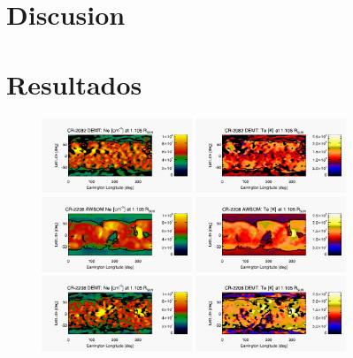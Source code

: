 \documentclass[baaa]{baaa}
\begin{document}
\section{Discusion}


\section{Resultados}

\begin{figure}
  \centering
  \includegraphics[width=0.4\textwidth]{figuras/map_Ne_CR2082_DEMT-EUVI_behind_H1-L3523_r3d_1105_Rsun.jpg}
  \includegraphics[width=0.4\textwidth]{figuras/map_Tm_CR2082_DEMT-EUVI_behind_H1-L3523_r3d_1105_Rsun.jpg}
  \includegraphics[width=0.4\textwidth]{figuras/map_Ne_awsom_2208_185_short_1105_Rsun.jpg}
  \includegraphics[width=0.4\textwidth]{figuras/map_Te_awsom_2208_185_short_1105_Rsun.jpg}
  \includegraphics[width=0.4\textwidth]{figuras/map_Ne_CR2208_DEMT-AIA_H1_L522_r3d_1105_Rsun.jpg}
  \includegraphics[width=0.4\textwidth]{figuras/map_Tm_CR2208_DEMT-AIA_H1_L522_r3d_1105_Rsun.jpg}  

\end{figure}
\end{document}
